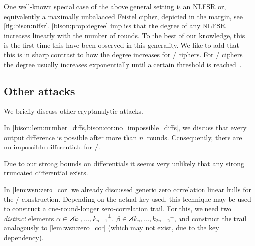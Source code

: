 One well-known special case of the above general setting is an NLFSR or, equivalently a maximally unbalanced Feistel cipher, depicted in the margin, see \cref{fig:bison:nlfsr}.
\cref{bison:prop:degree} implies that the degree of any NLFSR increases linearly with the number of rounds.
To the best of our knowledge, this is the first time this have been observed in this generality.
We like to add that this is in sharp contrast to how the degree increases for \SPN/ ciphers.
For \SPN/ ciphers the degree usually increases exponentially until a certain threshold is reached~\cite{FSE:BouCanDeC11}.

\subsection{Other attacks}
\label{subsec:bison-other-attacks}
We briefly discuss other cryptanalytic attacks.

In \cref{bison:lem:number_diffs,bison:cor:no_impossible_diffs}, we discuss that every output difference is possible after more than $n$~rounds.
Consequently, there are no impossible differentials for \bison/.

Due to our strong bounds on differentials it seems very unlikely that any strong truncated differential exists.

In \cref{lem:wsn:zero_cor} we already discussed generic zero correlation linear hulls for the \WSN/ construction.
Depending on the actual key used, this technique may be used to construct a one-round-longer zero-correlation trail.
For this, we need two \emph{distinct} elements $\alpha \in \angles{k_1, \dots, k_{n-1}}^\perp$, $\beta \in \angles{k_n, \dots, k_{2n-2}}^\perp$, and construct the trail analogously to \cref{lem:wsn:zero_cor} (which may not exist, due to the key dependency).

